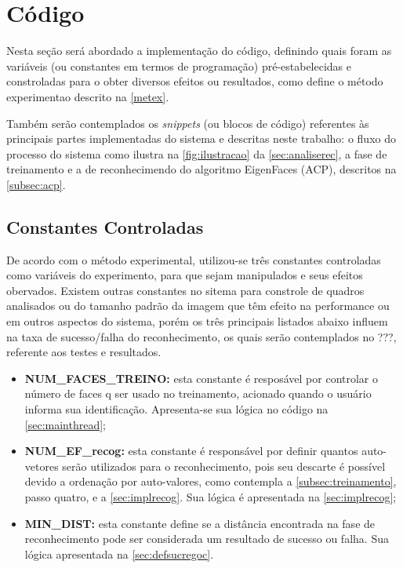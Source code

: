 \section{Código}\label{sec:codigo}

Nesta seção será abordado a implementação do código, definindo quais foram as variáveis (ou constantes em termos de programação) pré-estabelecidas e constroladas para o obter diversos efeitos ou resultados, como define o método experimentao descrito na \autoref{metex}.

Também serão contemplados os \textit{snippets} (ou blocos de código) referentes às principais partes implementadas do sistema e descritas neste trabalho: o fluxo do processo do sistema como ilustra na \autoref{fig:ilustracao} da \autoref{sec:analiserec}, a fase de treinamento e a de reconhecimendo do algoritmo EigenFaces (ACP), descritos na \autoref{subsec:acp}.

\subsection{Constantes Controladas}\label{sec:consts}

De acordo com o método experimental, utilizou-se três constantes controladas como variáveis do experimento, para que sejam manipulados e seus efeitos obervados. Existem outras constantes no sitema para constrole de quadros analisados ou do tamanho padrão da imagem que têm efeito na performance ou em outros aspectos do sistema, porém os três principais listados abaixo influem na taxa de sucesso/falha do reconhecimento, os quais serão contemplados no ???, referente aos testes e resultados.

\begin{itemize}	
		\item \textbf{NUM\_FACES\_TREINO:} esta constante é resposável por controlar o número de faces q ser usado no treinamento, acionado quando o usuário informa sua identificação. Apresenta-se sua lógica no código na \autoref{sec:mainthread};
		
		\item \textbf{NUM\_EF\_recog:} esta constante é responsável por definir quantos auto-vetores serão utilizados para o reconhecimento, pois seu descarte é possível devido a ordenação por auto-valores, como contempla a \autoref{subsec:treinamento}, passo quatro, e a \autoref{sec:implrecog}. Sua lógica é apresentada na \autoref{sec:implrecog};
		
		\item \textbf{MIN\_DIST:} esta constante define se a distância encontrada na fase de reconhecimento pode ser considerada um resultado de sucesso ou falha. Sua lógica apresentada na \autoref{sec:defsucregoc}.
\end{itemize}



